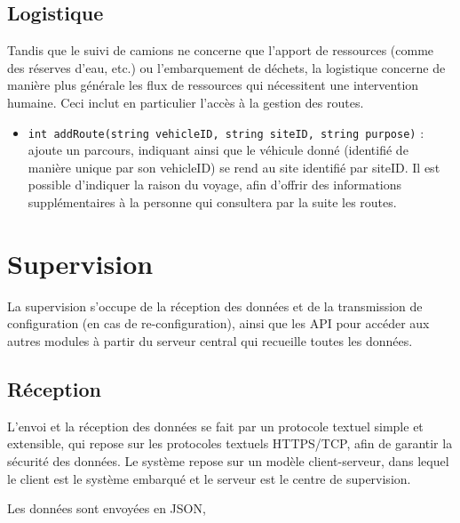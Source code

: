 \subsection{Logistique}

Tandis que le suivi de camions ne concerne que l'apport de ressources (comme des réserves d'eau, etc.) ou l'embarquement de déchets, la logistique concerne de manière plus générale les flux de ressources qui nécessitent une intervention humaine. Ceci inclut en particulier l'accès à la gestion des routes.

\begin{itemize}
\item \texttt{int addRoute(string vehicleID, string siteID, string purpose)} : ajoute un parcours, indiquant ainsi que le véhicule donné (identifié de manière unique par son vehicleID) se rend au site identifié par siteID. Il est possible d'indiquer la raison du voyage, afin d'offrir des informations supplémentaires à la personne qui consultera par la suite les routes.
\end{itemize}


\section{Supervision}

La supervision s'occupe de la réception des données et de la transmission de configuration (en cas de re-configuration), ainsi que les API pour accéder aux autres modules à partir du serveur central qui recueille toutes les données.

\subsection{Réception}

L'envoi et la réception des données se fait par un protocole textuel simple et extensible, qui repose sur les protocoles textuels HTTPS/TCP, afin de garantir la sécurité des données. Le système repose sur un modèle client-serveur, dans lequel le client est le système embarqué et le serveur est le centre de supervision.

Les données sont envoyées en JSON\footnotemark, 


